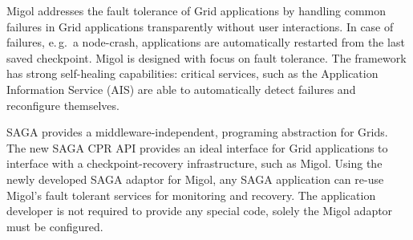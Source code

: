 \documentclass[times, 10pt,twocolumn]{article}
\begin{document}
Migol addresses the fault tolerance of Grid applications by handling common failures 
in Grid applications transparently without user interactions.  In case of failures, 
e.\,g.\ a node-crash, applications are automatically restarted 
from the last saved checkpoint.   
Migol is designed with focus on fault tolerance. 
The framework has strong self-healing capabilities: critical services, 
such as the Application Information Service (AIS) are
able to automatically detect failures and reconfigure themselves. 

SAGA provides a middleware-independent, programing abstraction for Grids. The new 
SAGA CPR API provides an ideal interface for Grid applications to interface with 
a checkpoint-recovery infrastructure, such as Migol. Using the newly developed SAGA adaptor for 
Migol, any SAGA application can re-use Migol's fault tolerant services for monitoring and recovery.
The application developer is not required to provide any special code, solely the Migol adaptor must be
configured.




\end{document}
